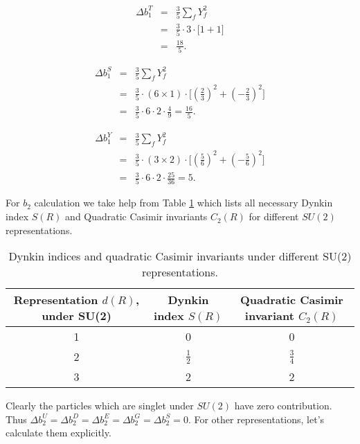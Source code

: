 \documentclass[11pt,prd,superscriptaddress,nofootinbib]{revtex4-1}
\numberwithin{equation}{section}
\newcommand{\bea}{\begin{eqnarray}}
\newcommand{\eea}{\end{eqnarray}}
\begin{document}
\bea
\label{XTb1}
\Delta b_1^T &=& \frac{3}{5}\sum_{f} Y_f^2 \nonumber\\
&=&  \frac{3}{5}\cdot 3\cdot\big[1+1\big]\nonumber\\
&=&  \boxed{\frac{18}{5}}.
\eea

\bea
\label{XSb1}
\Delta b_1^S &=& \frac{3}{5}\sum_{f} Y_f^2 \nonumber\\
&=&  \frac{3}{5}\cdot(6\times 1)\cdot\big[(\frac{2}{3})^2+(-\frac{2}{3})^2\big]\nonumber\\
&=& \frac{3}{5}\cdot 6\cdot 2\cdot\frac{4}{9} = \boxed{\frac{16}{5}}.
\eea

\bea
\label{XYb1}
\Delta b_1^Y &=& \frac{3}{5}\sum_{f} Y_f^2 \nonumber\\
&=&  \frac{3}{5}\cdot(3\times 2)\cdot\big[(\frac{5}{6})^2+(-\frac{5}{6})^2\big]\nonumber\\
&=& \frac{3}{5}\cdot 6\cdot 2\cdot\frac{25}{36} = \boxed{5}.
\eea


For $b_2$ calculation we take help from Table \ref{tab:SU2} which lists all necessary Dynkin index $S(R)$ and Quadratic Casimir invariants $C_2(R)$ for different $SU(2)$ representations. 

\begin{table}[H]
\begin{center}
\begin{tabular}{|c|c|c|}
\hline
Representation $d(R)$, under SU(2)  & Dynkin index $S(R)$ & Quadratic Casimir invariant $C_2(R)$\\  \hline\hline
 1 & 0 & 0
\\ \hline
 2 & $\frac{1}{2}$ & $\frac{3}{4}$ \\ \hline
 3 & 2 & 2 \\ \hline
\end{tabular}
\caption{Dynkin indices and quadratic Casimir invariants under different SU(2) representations.\label{tab:SU2}}
\vspace{-0.6cm}
\end{center}
\end{table}
Clearly  the particles which are singlet under $SU(2)$ have zero contribution. Thus $\Delta b_2^U= \Delta b_2^D=\Delta b_2^E=\Delta b_2^G=\Delta b_2^S=0$. For other representations, let's calculate them explicitly.
\end{document}
